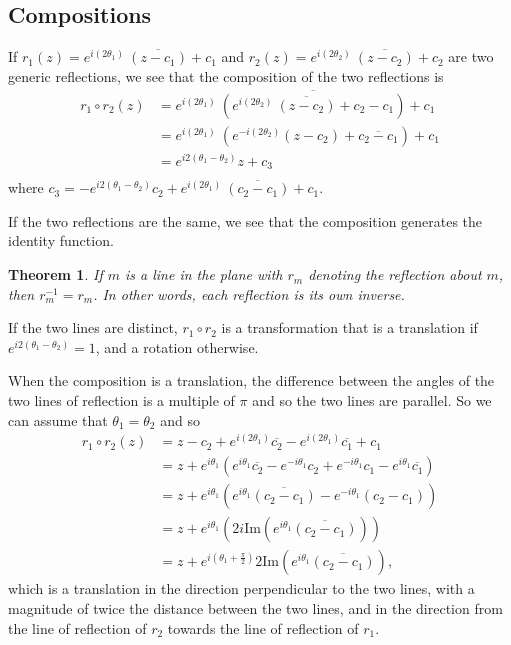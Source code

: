 \documentclass[
]{book}
\newtheorem{theorem}{Theorem}[chapter]
\theoremstyle{definition}
\theoremstyle{definition}
\theoremstyle{definition}
\theoremstyle{definition}
\theoremstyle{remark}
\begin{document}
\hypertarget{compositions-1}{%
\subsection{Compositions}\label{compositions-1}}

If \(r_1 (z) = e^{i(2\theta_1)} \: \overline{(z-c_1)} + c_1\) and \(r_2 (z) = e^{i(2\theta_2)} \: \overline{(z-c_2)} + c_2\) are two generic reflections, we see that the composition of the two reflections is
\begin{align*}
     r_1 \circ r_2 (z) & = e^{i (2\theta_1)} \: \overline{ \left( e^{i(2\theta_2)} \: \overline{(z-c_2)} + c_2-c_1 \right)} + c_1 \\
     & = e^{i (2\theta_1)} \: \left( e^{-i(2\theta_2)} (z-c_2) + \overline{c_2-c_1} \right) + c_1 \\
     & = e^{i 2(\theta_1-\theta_2)} z + c_3\\
\end{align*}
where \(c_3 = -e^{i2(\theta_1-\theta_2)}c_2 + e^{i(2\theta_1)} \: \overline{\left(c_2-c_1\right)} +c_1\).

If the two reflections are the same, we see that the composition generates the identity function.

\begin{theorem}
If \(m\) is a line in the plane with \(r_m\) denoting the reflection about \(m\), then \(r_m^{-1}=r_m\). In other words, each reflection is its own inverse.
\end{theorem}

If the two lines are distinct, \(r_1 \circ r_2\) is a transformation that is a translation if \(e^{i 2(\theta_1-\theta_2)}=1\), and a rotation otherwise.

When the composition is a translation, the difference between the angles of the two lines of reflection is a multiple of \(\pi\) and so the two lines are parallel. So we can assume that \(\theta_1=\theta_2\) and so
\begin{align*}
    r_1 \circ r_2 (z) & = z-c_2 +e^{i(2\theta_1)} \overline{c_2}  - e^{i(2\theta_1)} \overline{c_1} + c_1  \\
    & = z+ e^{i\theta_1}  \left( e^{i\theta_1} \overline{c_2} - e^{-i\theta_1} c_2 + e^{-i\theta_1}c_1 - e^{i\theta_1} \overline{c_1} \right)  \\
    & = z + e^{i \theta_1} \left( e^{i \theta_1} \overline{(c_2-c_1)} - e^{-i\theta_1} (c_2-c_1)\right) \\
    & = z + e^{i\theta_1} \left( 2i \mbox{Im} \left( e^{i \theta_1} \overline{(c_2-c_1)} \right) \right) \\
    & = z + e^{i (\theta_1+\frac{\pi}{2})} 2 \mbox{Im} \left( e^{i \theta_1} \overline{(c_2-c_1)} \right) ,
\end{align*}
which is a translation in the direction perpendicular to the two lines, with a magnitude of twice the distance between the two lines, and in the direction from the line of reflection of \(r_2\) towards the line of reflection of \(r_1\).
\end{document}
